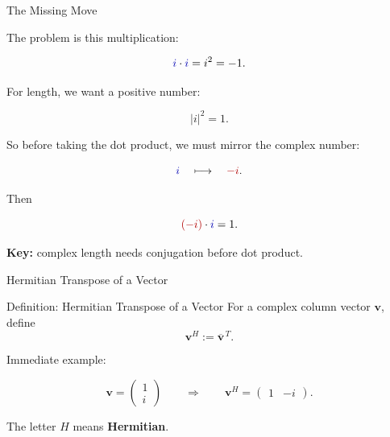 \documentclass[10pt]{beamer}
\theoremstyle{definition}
\newcommand{\x}[1]{\alert{\textbf{#1}}}
\newcommand{\rd}[1]{{\color{red!70!black}#1}}
\newcommand{\bl}[1]{{\color{blue!70!black}#1}}
\begin{document}
\begin{frame}[shrink=5]{The Missing Move}

The problem is this multiplication:

$$
\bl{i}\cdot \bl{i}=i^2=-1.
$$

\vfill

For length, we want a positive number:

$$
|i|^2=1.
$$

\vfill\pause

So before taking the dot product, we must mirror the complex number:

$$
\bl{i}\quad\longmapsto\quad \rd{-i}.
$$

\vfill\pause

Then

$$
\rd{(-i)}\cdot \bl{i}=1.
$$

\vfill

\x{Key:} complex length needs conjugation before dot product.

\end{frame}


\begin{frame}{Hermitian Transpose of a Vector}

\begin{block}{Definition: Hermitian Transpose of a Vector}
For a complex column vector $\mathbf{v}$, define
$$
\mathbf{v}^H:=\overline{\mathbf{v}}^{\,T}.
$$
\end{block}

\vfill

Immediate example:

$$
\mathbf{v}=\begin{pmatrix}1\\ i\end{pmatrix}
\qquad\Longrightarrow\qquad
\mathbf{v}^H=\begin{pmatrix}1&-i\end{pmatrix}.
$$

\vfill

The letter $H$ means \x{Hermitian}.

\end{frame}
\end{document}
